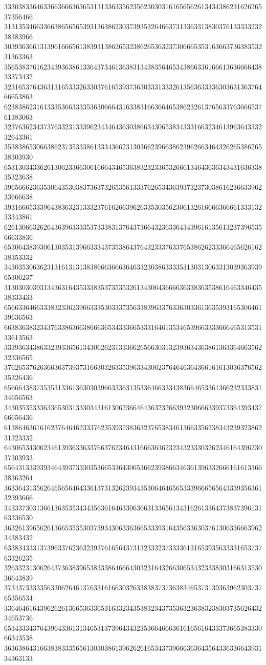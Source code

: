 33303833646336636663636531313363356235623030316165656261343438623162626537356466
31313534663366386565653931363862303739353264663731336331383037613333323238383966
30393636613139616665613839313862653238626536323730666535316366373638353231363363
35653837616234393638613364373461363831343835646534386633616661363666643833373432
32316537643631316533326330376165393736303331333261356363333630363136376466653863
62383862316133353663333536306664316338316636646538623261376563376366653761383063
32376362343737633231333962343464363038663430653834333166323461396364333232643361
35383865306638623735333861333436623130366239663862396266346432626538626538303930
65313034336261306233663061666434653638323233653266613464363634343163633835323638
39656662363530643530383736373265356133376265343639373237303861623663396233666638
39316665333964383632313332376162663962633530356230613261666636666133313233343861
62613066326264363963333537333831376437366432363364343961613561323739653566633836
65306438393061303531396633343735386437643233376337653862623336646562616238353332
34303530636231316131313838666366636463323038633335313031306331303936393965306237
31303030393134363164353338353735353261343064366663633836353861646334643538333433
65663364663338323362396633353033373563383963376336303361363539316530646139636563
66383638323437633863663866636534333665333164613534653966333366646531353133613563
33393634386332393365613430626231333662656630313239363436386136336466356232336565
37626537626366363739373166303263353963343062376464636436616161303637656235326436
65666438373535313361363030396633363135336466333438366465336136623233383134656563
34303535333633653031333034316130623664643632326639323066633937336439343766656436
61386463616162376464623337623539373836323765383461366335623834323932386231323332
64306534306234613936336337663762346431666363623234323330326234616439623037303933
65643133393934643937333035366533643065366239386634636139633266616161336638363264
36336431356264656564643361373132623934353064646565333966656564333935636132393666
34333730313661363535343435636164633063663133656134316261336437383739613163336530
36326139656261366535353037393430633636653339316435633630376130633666396234383432
63383433313739633762363239376165643731323332373333613165393563333165373763326235
32633231306264373638396538333864666430323164326630653432333830316631353036643839
37343733333563306264613763316166303263383837373638346537313936396230373765356534
33646461643962626136653633653163323435383234373536323638323830373562643234653736
65343334376439643361313465313739643432353664666361616561643337366538333066343538
36363864316638383335656130303861396262616534373966636364356433633664393134363133
